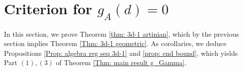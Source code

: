 \documentclass[11pt]{amsart}
\theoremstyle{definition}
\newenvironment{customthm}[1]
  {\renewcommand\theinnercustomthm{#1}\innercustomthm}
  {\endinnercustomthm}
\newcommand{\PP}{\mathbb{P}}
\newcommand{\PPP}{\mathbb{P}}
\begin{document}







\section{Criterion for $g_A(d)=0$}\label{sec: smallest and largest r}

In this section, we prove Theorem \ref{thm: 3d-1 artinian}, which by the previous section implies Theorem \ref{Thm: 3d-1 geometric}. As corollaries, we deduce Propositions \ref{Prop: algebra reg seq 3d-1} and \ref{prop: end bound}, which yields Part $(1), (3)$ of Theorem \ref{Thm: main result g_Gamma}.
\end{document}
